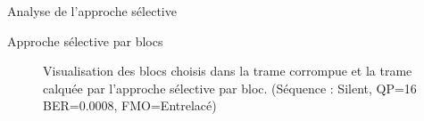 \begin{section}{Analyse de l'approche sélective}
\begin{subsection}{Approche sélective par blocs}
\begin{figure}
{{			
		}
	} 
\caption[Blocs choisis dans la trame corrompue et la trame calquée par
l'approche sélective par bloc (entrelacé)]{Visualisation des blocs choisis dans
la trame corrompue et la trame calquée par l'approche sélective par bloc.
(Séquence : Silent, QP=16 BER=0.0008, FMO=Entrelacé)}
\label{fig-SilentBlockSel}
\end{figure}


\end{subsection}
\end{section}
